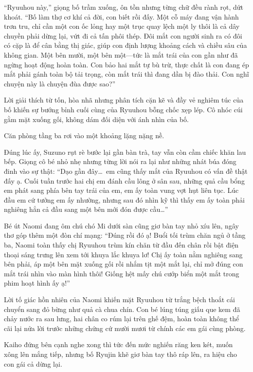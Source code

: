 ﻿\documentclass[../main.tex]{subfiles}
\begin{document}
``Ryuuhou này,'' giọng bố trầm xuống, ôn tồn nhưng từng chữ đều rành rọt, dứt khoát. ``Bố làm thợ cơ khí cả đời, con biết rồi đấy. Một cỗ máy đang vận hành trơn tru, chỉ cần một con ốc lỏng hay một trục quay lệch một ly thôi là cả dây chuyền phải dừng lại, vứt đi cả tấn phôi thép. Đôi mắt con người sinh ra có đôi có cặp là để cân bằng thị giác, giúp con định lượng khoảng cách và chiều sâu của không gian. Một bên mười, một bên một—tức là mắt trái của con gần như đã ngừng hoạt động hoàn toàn. Con bảo hai mắt tự bù trừ, thực chất là con đang ép mắt phải gánh toàn bộ tải trọng, còn mắt trái thì đang dần bị đào thải. Con nghĩ chuyện này là chuyện đùa được sao?''

Lời giải thích từ tốn, hòa nhã nhưng phân tích cặn kẽ và đầy vẻ nghiêm túc của bố khiến sự bướng bỉnh cuối cùng của Ryuuhou bỗng chốc xẹp lép. Cô nhóc cúi gằm mặt xuống gối, không dám đối diện với ánh nhìn của bố.

Căn phòng tầng ba rơi vào một khoảng lặng nặng nề.

Đúng lúc ấy, Suzuno rụt rè bước lại gần bàn trà, tay vẫn còn cầm chiếc khăn lau bếp. Giọng cô bé nhỏ nhẹ nhưng từng lời nói ra lại như những nhát búa đóng đinh vào sự thật: ``Dạo gần đây\dots\ em cũng thấy mắt của Ryuuhou có vấn đề thật đấy ạ. Cuối tuần trước hai chị em đánh cầu lông ở sân sau, những quả cầu bổng em phát sang phía bên tay trái của em, em ấy toàn vung vợt hụt liên tục. Lúc đầu em cứ tưởng em ấy nhường, nhưng sau đó nhìn kỹ thì thấy em ấy toàn phải nghiêng hẳn cả đầu sang một bên mới đón được cầu\dots''

Bé út Naomi đang ôm chú chó Mi dưới sàn cũng giơ bàn tay nhỏ xíu lên, ngây thơ góp thêm một đòn chí mạng: ``Đúng rồi đó ạ! Buổi tối trùm chăn ngủ ở tầng ba, Naomi toàn thấy chị Ryuuhou trùm kín chăn từ đầu đến chân rồi bật điện thoại sáng trưng lên xem tới khuya lắc khuya lơ! Chị ấy toàn nằm nghiêng sang bên phải, áp một bên mặt xuống gối rồi nhắm tịt một mắt lại, chỉ mở đúng con mắt trái nhìn vào màn hình thôi! Giống hệt mấy chú cướp biển một mắt trong phim hoạt hình ấy ạ!''

Lời tố giác hồn nhiên của Naomi khiến mặt Ryuuhou từ trắng bệch thoắt cái chuyển sang đỏ bừng như quả cà chua chín. Con bé lúng túng giấu que kem đã chảy nước ra sau lưng, hai chân co rúm lại trên ghế đệm, hoàn toàn không thể cãi lại nửa lời trước những chứng cứ mười mươi từ chính các em gái cùng phòng.

Kaiho đứng bên cạnh nghe xong thì tức đến mức nghiến răng ken két, muốn xông lên mắng tiếp, nhưng bố Ryujin khẽ giơ bàn tay thô ráp lên, ra hiệu cho con gái cả dừng lại.
\end{document}

